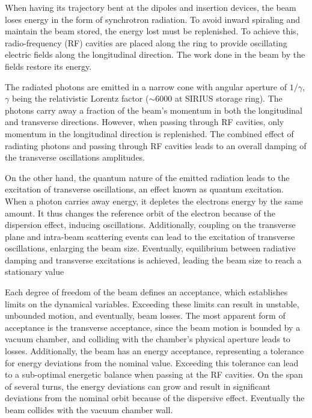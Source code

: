 When having its trajectory bent at the dipoles and insertion devices,
the beam loses energy in the form of synchrotron radiation. To avoid inward spiraling and maintain the beam stored, the energy lost must be replenished. To achieve this, radio-frequency (RF) cavities are placed along the ring to provide oscillating electric fields along the longitudinal direction. The work done in the beam by the fields restore its energy.

The radiated photons are emitted in a narrow cone with angular aperture of $1/\gamma$, $\gamma$ being the relativistic Lorentz factor ($\sim 6000$ at SIRIUS storage ring). The photons carry away a fraction of the beam's momentum in both the longitudinal and transverse directions. However, when passing through RF cavities, only momentum in the longitudinal direction is replenished. The combined effect of radiating photons and passing through RF cavities leads to an overall damping of the transverse oscillations amplitudes.

On the other hand, the quantum nature of the emitted radiation leads to the excitation of transverse oscillations, an effect known as quantum excitation. When a photon carries away energy, it depletes the electrons energy by the same amount. It thus changes the reference orbit of the electron because of the dispersion effect, inducing oscillations. Additionally, coupling on the transverse plane and intra-beam scattering events can lead to the excitation of transverse oscillations, enlarging the beam size.
Eventually, equilibrium between radiative damping and transverse excitations is achieved, leading the beam size to reach a stationary value

Each degree of freedom of the beam defines an acceptance, which establishes limits on the dynamical variables. Exceeding these limits can result in unstable, unbounded motion, and eventually, beam losses. The most apparent form of acceptance is the transverse acceptance, since the beam motion is bounded by a vacuum chamber, and colliding with the chamber's physical aperture leads to losses. Additionally, the beam has an energy acceptance, representing a tolerance for energy deviations from the nominal value. Exceeding this tolerance can lead to a sub-optimal energetic balance when passing at the RF cavities. On the span of several turns, the energy deviations can grow and result in significant deviations from the nominal orbit because of the dispersive effect. Eventually the beam collides with the vacuum chamber wall.

